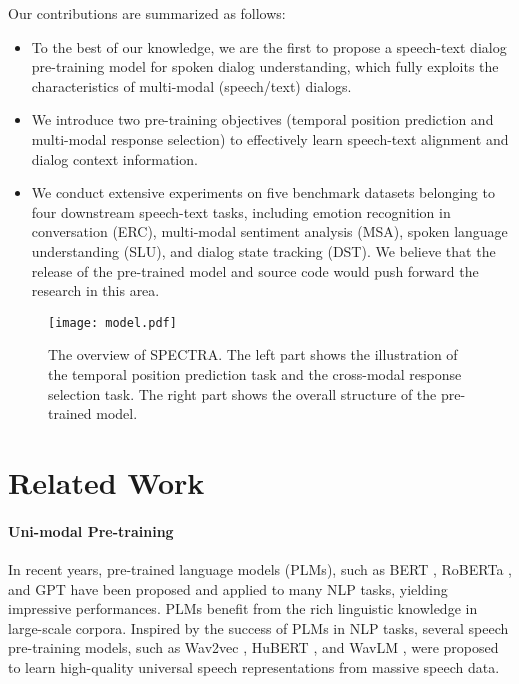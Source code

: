 \documentclass[11pt]{article}
\begin{document}
Our contributions are summarized as follows:
\begin{itemize}
\item To the best of our knowledge, we are the first to propose a speech-text dialog pre-training model for spoken dialog understanding, which fully exploits the characteristics of multi-modal (speech/text) dialogs.  
\item We introduce two pre-training objectives (temporal position prediction and multi-modal response selection) to effectively learn speech-text alignment and dialog context information. 
\item We conduct extensive experiments on five benchmark datasets belonging to four downstream speech-text tasks, including emotion recognition in conversation (ERC), multi-modal sentiment analysis (MSA), spoken language understanding (SLU), and dialog state tracking (DST). We believe that the release of the pre-trained model and source code would push forward the research in this area.
\end{itemize}

\begin{figure*}[t]
    \centering
    \texttt{[image: model.pdf]}
    \caption{The overview of SPECTRA. The left part shows the illustration of the temporal position prediction task and the cross-modal response selection task. The right part shows the overall structure of the pre-trained model.}
    \label{fig:model}
\end{figure*}


\section{Related Work}
\paragraph{Uni-modal Pre-training}
In recent years, pre-trained language models (PLMs), such as BERT \citep{bert}, RoBERTa \citep{roberta}, and GPT \citep{gpt2} have been proposed and applied to many NLP tasks, yielding impressive performances. PLMs benefit from the rich linguistic knowledge in large-scale corpora\cite{he2022galaxy, he2022space2}. Inspired by the success of PLMs in NLP tasks, several speech pre-training models, such as Wav2vec \citep{wav2vec}, HuBERT \citep{hubert}, and WavLM \citep{wavlm}, were proposed to learn high-quality universal speech representations from massive speech data.  
\end{document}
